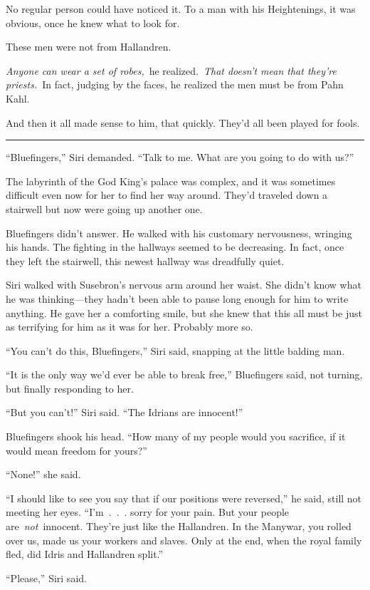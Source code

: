 No regular person could have noticed it. To a man with his Heightenings, it was obvious, once he knew what to look for.

These men were not from Hallandren.

\textit{Anyone can wear a set of robes,}~he realized.~\textit{That doesn’t mean that they’re priests.}~In fact, judging by the faces, he realized the men must be from Pahn Kahl.

And then it all made sense to him, that quickly. They’d all been played for fools.

\bigskip \hrule \bigskip

“Bluefingers,” Siri demanded. “Talk to me. What are you going to do with us?”

The labyrinth of the God King’s palace was complex, and it was sometimes difficult even now for her to find her way around. They’d traveled down a stairwell but now were going up another one.

Bluefingers didn’t answer. He walked with his customary nervousness, wringing his hands. The fighting in the hallways seemed to be decreasing. In fact, once they left the stairwell, this newest hallway was dreadfully quiet.

Siri walked with Susebron’s nervous arm around her waist. She didn’t know what he was thinking—they hadn’t been able to pause long enough for him to write anything. He gave her a comforting smile, but she knew that this all must be just as terrifying for him as it was for her. Probably more so.

“You can’t do this, Bluefingers,” Siri said, snapping at the little balding man.

“It is the only way we’d ever be able to break free,” Bluefingers said, not turning, but finally responding to her.

“But you can’t!” Siri said. “The Idrians are innocent!”

Bluefingers shook his head. “How many of my people would you sacrifice, if it would mean freedom for yours?”

“None!” she said.

“I should like to see you say that if our positions were reversed,” he said, still not meeting her eyes. “I’m~.~.~. sorry for your pain. But your people are~\textit{not}~innocent. They’re just like the Hallandren. In the Manywar, you rolled over us, made us your workers and slaves. Only at the end, when the royal family fled, did Idris and Hallandren split.”

“Please,” Siri said.

